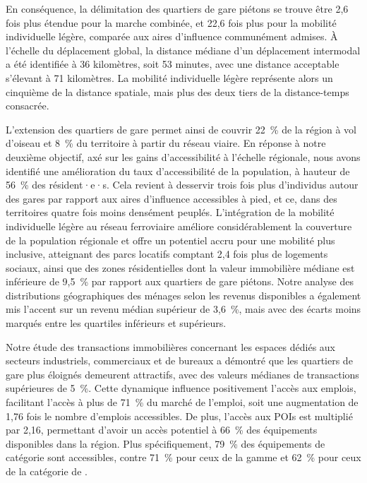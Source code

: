 \begin{refsegment}
En conséquence, la délimitation des quartiers de gare piétons se trouve être 2,6 fois plus étendue pour la marche combinée, et 22,6 fois plus pour la mobilité individuelle légère, comparée aux aires d'influence communément admises. À l'échelle du déplacement global, la distance médiane d'un déplacement intermodal a été identifiée à 36 kilomètres, soit 53 minutes, avec une distance acceptable s'élevant à 71 kilomètres. La mobilité individuelle légère représente alors un cinquième de la distance spatiale, mais plus des deux tiers de la distance-temps consacrée.%

L'extension des quartiers de gare permet ainsi de couvrir 22~\% de la région à vol d'oiseau et 8~\% du territoire à partir du réseau viaire. En réponse à notre deuxième objectif, axé sur les gains d'accessibilité à l'échelle régionale, nous avons identifié une amélioration du taux d'accessibilité de la population, à hauteur de 56~\% des résident·e·s. Cela revient à desservir trois fois plus d'individus autour des gares par rapport aux aires d'influence accessibles à pied, et ce, dans des territoires quatre fois moins densément peuplés. L'intégration de la mobilité individuelle légère au réseau ferroviaire améliore considérablement la couverture de la population régionale et offre un potentiel accru pour une mobilité plus inclusive, atteignant des parcs locatifs comptant 2,4 fois plus de logements sociaux, ainsi que des zones résidentielles dont la valeur immobilière médiane est inférieure de 9,5~\% par rapport aux quartiers de gare piétons. Notre analyse des distributions géographiques des ménages selon les revenus disponibles a également mis l'accent sur un revenu médian supérieur de 3,6~\%, mais avec des écarts moins marqués entre les quartiles inférieurs et supérieurs.%

Notre étude des transactions immobilières concernant les espaces dédiés aux secteurs industriels, commerciaux et de bureaux a démontré que les quartiers de gare plus éloignés demeurent attractifs, avec des valeurs médianes de transactions supérieures de 5~\%. Cette dynamique influence positivement l'accès aux emplois, facilitant l'accès à plus de 71~\% du marché de l'emploi, soit une augmentation de 1,76 fois le nombre d'emplois accessibles. De plus, l'accès aux \acrshort{POIs} est multiplié par 2,16, permettant d'avoir un accès potentiel à 66~\% des équipements disponibles dans la région. Plus spécifiquement, 79~\% des équipements de catégorie  sont accessibles, contre 71~\% pour ceux de la gamme  et 62~\% pour ceux de la catégorie de .%


\end{refsegment}
